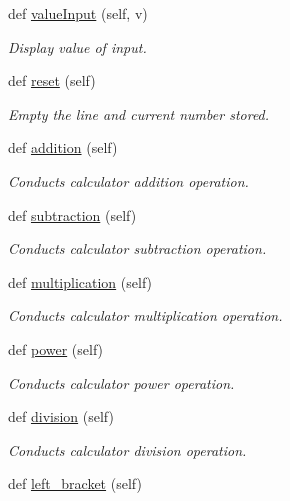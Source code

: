 \begin{DoxyCompactItemize}
def \hyperlink{classmain__calculator_1_1_calculator_a9a9b05869e5fd1f5110bbe8d8005ba43}{value\+Input} (self, v)
\begin{DoxyCompactList}\small\item\em Display value of input. \end{DoxyCompactList}\item 
def \hyperlink{classmain__calculator_1_1_calculator_aac4299e4225a6aeeb11bc5410d900707}{reset} (self)
\begin{DoxyCompactList}\small\item\em Empty the line and current number stored. \end{DoxyCompactList}\item 
def \hyperlink{classmain__calculator_1_1_calculator_a7b20e7af5b1fdbd6061f6ea74b5b7a10}{addition} (self)
\begin{DoxyCompactList}\small\item\em Conducts calculator addition operation. \end{DoxyCompactList}\item 
def \hyperlink{classmain__calculator_1_1_calculator_a49813f25efdf28cf1ee41c9ffd6dd282}{subtraction} (self)
\begin{DoxyCompactList}\small\item\em Conducts calculator subtraction operation. \end{DoxyCompactList}\item 
def \hyperlink{classmain__calculator_1_1_calculator_a1358fbc08c2e9c60cb50f15c28649ffe}{multiplication} (self)
\begin{DoxyCompactList}\small\item\em Conducts calculator multiplication operation. \end{DoxyCompactList}\item 
def \hyperlink{classmain__calculator_1_1_calculator_a744ccd099c8deb999062579a9d8aa152}{power} (self)
\begin{DoxyCompactList}\small\item\em Conducts calculator power operation. \end{DoxyCompactList}\item 
def \hyperlink{classmain__calculator_1_1_calculator_acd2ea45d8a2e83dc8b2b0f555d972898}{division} (self)
\begin{DoxyCompactList}\small\item\em Conducts calculator division operation. \end{DoxyCompactList}\item 
def \hyperlink{classmain__calculator_1_1_calculator_ac64294792ca603503761632e96f811b7}{left\+\_\+bracket} (self)

\end{DoxyCompactItemize}
